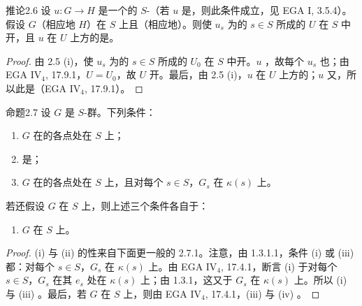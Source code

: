 \begin{SGAresult}{推论}{2.6}
设 $u:G\to H$ 是一个的 $S$-（若 $u$ 是，则此条件成立，见 EGA I, 3.5.4）。假设 $G$（相应地 $H$）在 $S$ 上且（相应地）。则使 $u_s$ 为的 $s\in S$ 所成的 $U$ 在 $S$ 中开，且 $u$ 在 $U$ 上方的是。
\end{SGAresult}
\begin{proof}
由 2.5 (i)，使 $u_s$ 为的 $s\in S$ 所成的 $U_0$ 在 $S$ 中开。$u$ ，故每个 $u_s$ 也；由 EGA IV$_4$, 17.9.1，$U=U_0$，故 $U$ 开。最后，由 2.5 (i)，$u$ 在 $U$ 上方的；$u$ 又，所以此是（EGA IV$_4$, 17.9.1）。
\end{proof}
\begin{SGAresult}{命题}{2.7}
设 $G$ 是 $S$-群。下列条件：
\begin{enumerate}
\item[(i)] $G$ 在的各点处在 $S$ 上；
\item[(ii)] 是；
\item[(iii)] $G$ 在的各点处在 $S$ 上，且对每个 $s\in S$，$G_s$ 在 $\kappa(s)$ 上。
\end{enumerate}
若还假设 $G$ 在 $S$ 上，则上述三个条件各自于：
\begin{enumerate}\item[(iv)] $G$ 在 $S$ 上。\end{enumerate}
\end{SGAresult}
\begin{proof}
(i) 与 (ii) 的性来自下面更一般的 2.7.1。注意，由 1.3.1.1，条件 (i) 或 (iii) 都：对每个 $s\in S$，$G_s$ 在 $\kappa(s)$ 上。由 EGA IV$_4$, 17.4.1，断言 (i) 于对每个 $s\in S$，$G_s$ 在其 $e_s$ 处在 $\kappa(s)$ 上；由 1.3.1，这又于 $G_s$ 在 $\kappa(s)$ 上。所以 (i) 与 (iii) 。最后，若 $G$ 在 $S$ 上，则由 EGA IV$_4$, 17.4.1，(iii) 与 (iv) 。
\end{proof}
